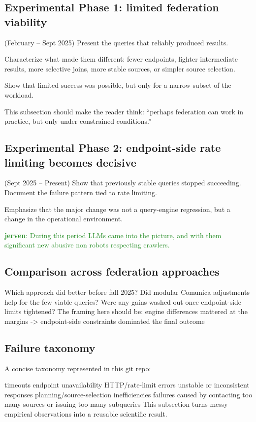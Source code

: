 \documentclass[runningheads]{llncs}
\newcommand{\jerven}[1]{\textcolor{ForestGreen}{\textbf{jerven}: #1}}
\begin{document}
\subsection{Experimental Phase 1: limited federation viability}\label{sec4.2}
(February -- Sept 2025)
Present the queries that reliably produced results.

Characterize what made them different: fewer endpoints, lighter intermediate results, more selective joins, more stable sources, or simpler source selection.

Show that limited success was possible, but only for a narrow subset of the workload.

This subsection should make the reader think: “perhaps federation can work in practice, but only under constrained conditions.”


\subsection{Experimental Phase 2: endpoint-side rate limiting becomes decisive}\label{sec4.3}
(Sept 2025 -- Present)
Show that previously stable queries stopped succeeding. Document the failure pattern tied to rate limiting.

Emphasize that the major change was not a query-engine regression, but a change in the operational environment.

\jerven{During this period LLMs came into the picture, and with them significant new abusive non robots respecting crawlers.}

\subsection{Comparison across federation approaches}\label{sec4.3}

Which approach did better before fall 2025?
Did modular Comunica adjustments help for the few viable queries?
Were any gains washed out once endpoint-side limits tightened?
The framing here should be: engine differences mattered at the margins -> endpoint-side constraints dominated the final outcome

\subsection{Failure taxonomy}\label{sec4.4}
A concise taxonomy represented in this git repo:

timeouts
endpoint unavailability
HTTP/rate-limit errors
unstable or inconsistent responses
planning/source-selection inefficiencies
failures caused by contacting too many sources or issuing too many subqueries
This subsection turns messy empirical observations into a reusable scientific result.
\end{document}
